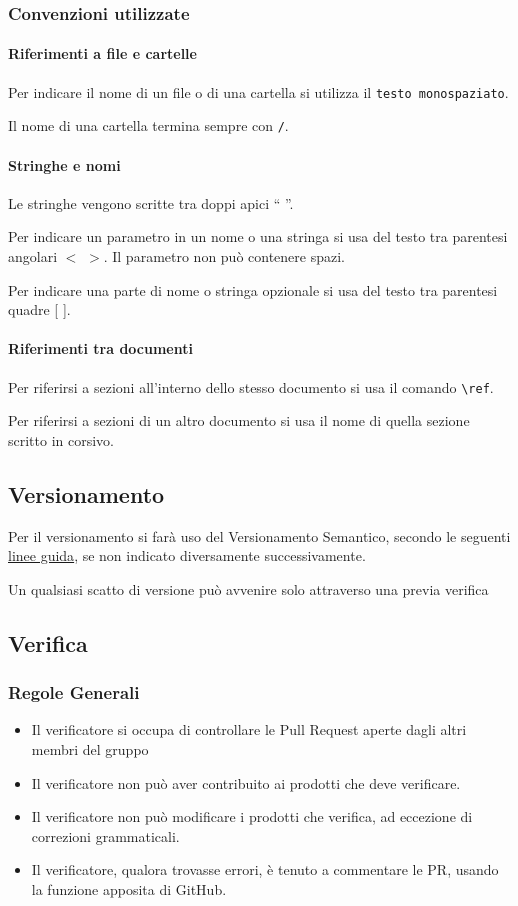 \documentclass[a4paper, 12pt]{article}
\begin{document}
\subsubsection{Convenzioni utilizzate}
\paragraph{Riferimenti a file e cartelle}
Per indicare il nome di un file o di una cartella si utilizza il  \texttt{testo monospaziato}.

Il nome di una cartella termina sempre con \texttt{/}.

\paragraph{Stringhe e nomi}
Le stringhe vengono scritte tra doppi apici `` ''.

Per indicare un parametro in un nome o una stringa si usa del testo tra parentesi angolari $<$ $>$. Il parametro non può contenere spazi.

Per indicare una parte di nome o stringa opzionale si usa del testo tra parentesi quadre [ ].

\paragraph{Riferimenti tra documenti}
Per riferirsi a sezioni all'interno dello stesso documento si usa il comando \verb-\ref-.

Per riferirsi a sezioni di un altro documento si usa il nome di quella sezione scritto in corsivo.

\subsection{Versionamento}
Per il versionamento si farà uso del Versionamento Semantico, secondo le seguenti \href{https://semver.org/lang/it/#specifica-di-versionamento-semantico-semver}{linee guida}, se non indicato diversamente successivamente.

Un qualsiasi scatto di versione può avvenire solo attraverso una previa verifica
\subsection{Verifica}
\subsubsection{Regole Generali}
\begin{itemize}
\item Il verificatore si occupa di controllare le Pull Request aperte dagli altri membri del gruppo
\item Il verificatore non può aver contribuito ai prodotti che deve verificare.
\item Il verificatore non può modificare i prodotti che verifica, ad eccezione di correzioni grammaticali.
\item Il verificatore, qualora trovasse errori, è tenuto a commentare le PR, usando la funzione apposita di GitHub.
\end{itemize}
\end{document}
